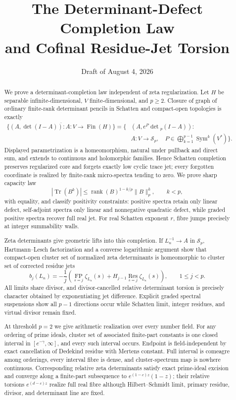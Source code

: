 \documentclass[11pt]{article}
\title{The Determinant-Defect Completion Law\\
and Cofinal Residue-Jet Torsion}
\author{}
\date{Draft of August 4, 2026}
\theoremstyle{definition}
\theoremstyle{remark}
\newcommand{\Res}{\operatorname*{Res}}
\newcommand{\FP}{\operatorname*{FP}}
\newcommand{\Tr}{\operatorname{Tr}}
\newcommand{\norm}[1]{\lVert #1\rVert}
\begin{document}
\maketitle

\begin{abstract}
We prove a determinant-completion law independent of zeta regularization.  Let $H$ be separable
infinite-dimensional, $V$ finite-dimensional, and $p\geq2$.  Closure of graph of ordinary
finite-rank determinant pencils in Schatten and compact-open topologies is exactly
\[
\begin{aligned}
 \overline{\{(A,\det(I-A)):A:V\to\operatorname{Fin}(H)\}}
 =\bigl\{&\left(A,e^P\det{}_p(I-A)\right):\\[-2pt]
 &A:V\to\mathcal S_p,\quad
 P\in\textstyle\bigoplus_{k=1}^{p-1}\operatorname{Sym}^k(V^*)\bigr\}.
\end{aligned}
\]
Displayed parametrization is a homeomorphism, natural under pullback and direct sum, and extends
to continuous and holomorphic families.  Hence Schatten completion preserves regularized core
and forgets exactly low cyclic trace jet; every forgotten coordinate is realized by finite-rank
micro-spectra tending to zero.  We prove sharp capacity law
\[
 |\Tr(B^k)|\leq\operatorname{rank}(B)^{1-k/p}\norm{B}_p^k,
 \qquad k<p,
\]
with equality, and classify positivity constraints: positive spectra retain only linear defect,
self-adjoint spectra only linear and nonnegative quadratic defect, while graded positive spectra
recover full real jet.  For real Schatten exponent $r$, fibre jumps precisely at integer
summability walls.

Zeta determinants give geometric lifts into this completion.  If $L_n^{-1}\to A$ in
$\mathcal S_p$, Hartmann--Lesch factorization and a converse logarithmic argument show that
compact-open cluster set of normalized zeta determinants is homeomorphic to cluster set of
corrected residue jets
\[
 b_j(L_n)=-\frac1j\left(\FP_{s=j}\zeta_{L_n}(s)
 +H_{j-1}\Res_{s=j}\zeta_{L_n}(s)\right),\qquad 1\leq j<p.
\]
All limits share divisor, and divisor-cancelled relative determinant torsion is precisely
character obtained by exponentiating jet difference.  Explicit graded spectral suspensions show
all $p-1$ directions occur while Schatten limit, integer residues, and virtual divisor remain
fixed.

At threshold $p=2$ we give arithmetic realization over every number field.  For any ordering of
prime ideals, cluster set of associated finite-part constants is one closed interval in
$[e^{-\gamma},\infty]$, and every such interval occurs.  Endpoint is field-independent by exact
cancellation of Dedekind residue with Mertens constant.  Full interval is comeagre among
orderings, every interval fibre is dense, and cluster-spectrum map is nowhere continuous.
Corresponding relative zeta determinants satisfy exact prime-ideal excision and converge along a
finite-part subsequence to $e^{(1-c)z}(1-z)$; their relative torsions $e^{(d-c)z}$ realize full
real fibre although Hilbert--Schmidt limit, primary residue, divisor, and determinant line are
fixed.
\end{abstract}
\end{document}
